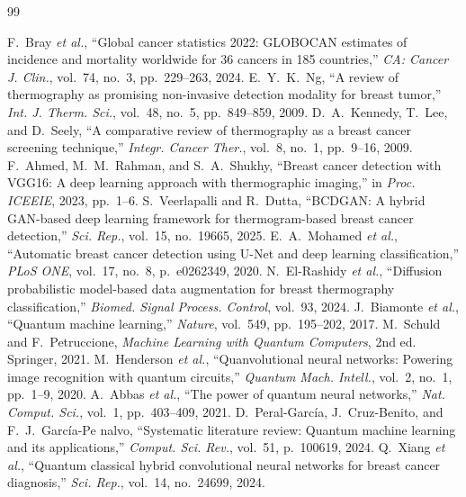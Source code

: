 \documentclass[conference]{IEEEtran}
\begin{document}

\begin{thebibliography}{99}

 F.~Bray \textit{et al.}, ``Global cancer statistics 2022: GLOBOCAN estimates of incidence and mortality worldwide for 36 cancers in 185 countries,'' \textit{CA: Cancer J. Clin.}, vol.~74, no.~3, pp.~229--263, 2024.
 E.~Y.~K.~Ng, ``A review of thermography as promising non-invasive detection modality for breast tumor,'' \textit{Int. J. Therm. Sci.}, vol.~48, no.~5, pp.~849--859, 2009.
 D.~A.~Kennedy, T.~Lee, and D.~Seely, ``A comparative review of thermography as a breast cancer screening technique,'' \textit{Integr. Cancer Ther.}, vol.~8, no.~1, pp.~9--16, 2009.
 F.~Ahmed, M.~M.~Rahman, and S.~A.~Shukhy, ``Breast cancer detection with VGG16: A deep learning approach with thermographic imaging,'' in \textit{Proc. ICEEIE}, 2023, pp.~1--6.
 S.~Veerlapalli and R.~Dutta, ``BCDGAN: A hybrid GAN-based deep learning framework for thermogram-based breast cancer detection,'' \textit{Sci. Rep.}, vol.~15, no.~19665, 2025.
 E.~A.~Mohamed \textit{et al.}, ``Automatic breast cancer detection using U-Net and deep learning classification,'' \textit{PLoS ONE}, vol.~17, no.~8, p.~e0262349, 2020.
 N.~El-Rashidy \textit{et al.}, ``Diffusion probabilistic model-based data augmentation for breast thermography classification,'' \textit{Biomed. Signal Process. Control}, vol.~93, 2024.
 J.~Biamonte \textit{et al.}, ``Quantum machine learning,'' \textit{Nature}, vol.~549, pp.~195--202, 2017.
 M.~Schuld and F.~Petruccione, \textit{Machine Learning with Quantum Computers}, 2nd ed. Springer, 2021.
 M.~Henderson \textit{et al.}, ``Quanvolutional neural networks: Powering image recognition with quantum circuits,'' \textit{Quantum Mach. Intell.}, vol.~2, no.~1, pp.~1--9, 2020.
 A.~Abbas \textit{et al.}, ``The power of quantum neural networks,'' \textit{Nat. Comput. Sci.}, vol.~1, pp.~403--409, 2021.
 D.~Peral-Garc\'ia, J.~Cruz-Benito, and F.~J.~Garc\'ia-Pe nalvo, ``Systematic literature review: Quantum machine learning and its applications,'' \textit{Comput. Sci. Rev.}, vol.~51, p.~100619, 2024.
 Q.~Xiang \textit{et al.}, ``Quantum classical hybrid convolutional neural networks for breast cancer diagnosis,'' \textit{Sci. Rep.}, vol.~14, no.~24699, 2024.

\end{thebibliography}
\end{document}

